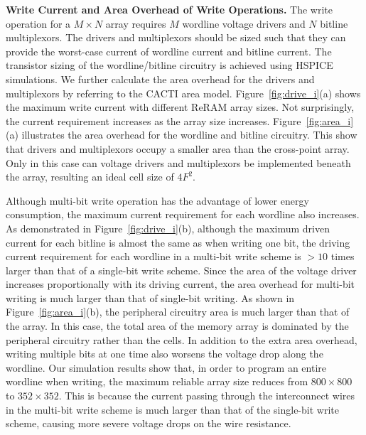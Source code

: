 \vspace{5pt}\noindent\textbf{Write Current and Area Overhead of Write Operations.}
%
The write operation for a $M \times N$ array requires $M$ wordline voltage
drivers and $N$ bitline multiplexors. The drivers and multiplexors should
be sized such that they can provide the worst-case current of wordline
current and bitline current. The transistor sizing of the wordline/bitline
circuitry is achieved using HSPICE simulations. We further calculate the
area overhead for the drivers and multiplexors by referring to the CACTI
area model. Figure~\ref{fig:drive_i}(a) shows the maximum write current
with different ReRAM array sizes. Not surprisingly, the current
requirement increases as the array size increases.
Figure~\ref{fig:area_i}(a) illustrates the area overhead for the wordline
and bitline circuitry. This show that drivers and multiplexors occupy a
smaller area than the cross-point array. Only in this case can voltage
drivers and multiplexors be implemented beneath the array, resulting an
ideal cell size of $4F^2$.

Although multi-bit write operation has the advantage of lower energy
consumption, the maximum current requirement for each wordline also
increases. As demonstrated in Figure~\ref{fig:drive_i}(b), although the
maximum driven current for each bitline is almost the same as when writing
one bit, the driving current requirement for each wordline in a multi-bit
write scheme is $>10$ times larger than that of a single-bit write scheme.
Since the area of the voltage driver increases proportionally with its
driving current, the area overhead for multi-bit writing is much larger
than that of single-bit writing. As shown in Figure~\ref{fig:area_i}(b),
the peripheral circuitry area is much larger than that of the array. In
this case, the total area of the memory array is dominated by the
peripheral circuitry rather than the cells. In addition to the extra area
overhead, writing multiple bits at one time also worsens the voltage drop
along the wordline. Our simulation results show that, in order to program
an entire wordline when writing, the maximum reliable array size reduces
from $800 \times 800$ to $352 \times 352$. This is because the current
passing through the interconnect wires in the multi-bit write scheme is
much larger than that of the single-bit write scheme, causing more severe
voltage drops on the wire resistance.


